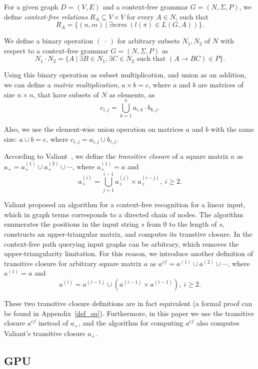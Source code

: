 For a given graph \mbox{$D = (V, E)$} and a context-free grammar $G = (N, \Sigma, P)$, we define \emph{context-free relations} \mbox{$R_A \subseteq V \times V$} for every \mbox{$A \in N$}, such that $$R_A = \{(n,m)~|~\exists n \pi m~(l(\pi) \in L(G,A))\}.$$

We define a binary operation $(~\cdot~)$ for arbitrary subsets \mbox{$N_1, N_2$} of $N$ with respect to a context-free grammar \mbox{$G = (N, \Sigma, P)$} as $$N_1 \cdot N_2 = \{A~|~\exists B \in N_1, \exists C \in N_2 \text{ such that }(A \rightarrow B C) \in P\}.$$

Using this binary operation as subset multiplication, and union as an addition, we can define a \emph{matrix multiplication}, \mbox{$a \times b = c$}, where $a$ and $b$ are matrices of size $n\times n$, that have subsets of $N$ as elements, as $$c_{i,j} = \bigcup^{n}_{k=1}{a_{i,k} \cdot b_{k,j}}.$$

Also, we use the element-wise union operation on matrices $a$ and $b$ with the same size: \mbox{$a \cup b = c$}, where $c_{i,j} = a_{i,j} \cup b_{i,j}.$

According to Valiant~\cite{valiant}, we define the \emph{transitive closure} of a square matrix $a$ as \mbox{$a_+ = a^{(1)}_+ \cup a^{(2)}_+ \cup \cdots$}, where \mbox{$a^{(1)}_+ = a$} and $$a^{(i)}_+ = \bigcup^{i-1}_{j=1}{a^{(j)}_+ \times a^{(i-j)}_+}, ~i \ge 2.$$

Valiant proposed an algorithm for a context-free recognition for a linear input, which in graph terms corresponds to a directed chain of nodes. The algorithm enumerates the positions in the input string $s$ from 0 to the length of $s$, constructs an upper-triangular matrix, and computes its transtive closure. In the context-free path querying input graphs can be arbitrary, which removes the upper-triangularity  limitation. For this reason, we introduce another definition of transitive closure for arbitrary square matrix $a$ as \mbox{$a^{cf} = a^{(1)} \cup a^{(2)} \cup \cdots$}, where \mbox{$a^{(1)} = a$} and $$a^{(i)} = a^{(i-1)} \cup (a^{(i-1)} \times a^{(i-1)}), ~i \ge 2.$$

These two transitive closure definitions are in fact equivalent (a formal proof can be found in Appendix~\ref{def_eq}). Furthermore, in this paper we use the transitive closure $a^{cf}$ instead of $a_+$, and the algorithm for computing $a^{cf}$ also computes Valiant's transitive closure $a_+$.

\subsection{GPU}